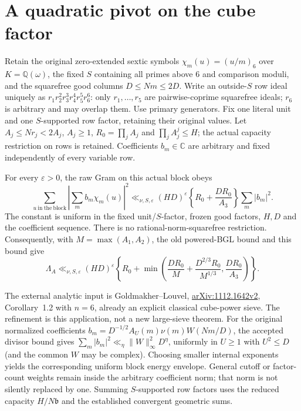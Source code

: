 \section{A quadratic pivot on the cube factor}\label{qp:core}
Retain the original zero-extended sextic symbols
$\chi_m(u)=(u/m)_6$ over $K=\mathbb Q(\omega)$, the fixed $S$ containing
all primes above $6$ and comparison moduli, and the squarefree good columns
$D\le Nm\le2D$. Write an outside-$S$ row ideal uniquely as
$r_1r_2^2r_3^3r_4^4r_5^5r_6^6$: only $r_1,\ldots,r_5$ are pairwise-coprime
squarefree ideals; $r_6$ is arbitrary and may overlap them. Use primary
generators. Fix one literal unit and one $S$-supported row factor, retaining
their original values. Let $A_j\le Nr_j<2A_j$, $A_j\ge1$,
$R_0=\prod_jA_j$ and $\prod_jA_j^j\le H$; the actual capacity restriction
on rows is retained. Coefficients $b_m\in\mathbb C$ are arbitrary and fixed
independently of every variable row.

\begin{proposition}\label{qp:bound}
For every $\varepsilon>0$, the raw Gram on this actual block obeys
\[
 \sum_{u\ \mathrm{in\ the\ block}}
       \left|\sum_m b_m\chi_m(u)\right|^2
 \ll_{\nu,S,\varepsilon}(HD)^\varepsilon
       \left\{R_0+\frac{DR_0}{A_3}\right\}\sum_m|b_m|^2.
\]
The constant is uniform in the fixed unit/$S$-factor, frozen good factors,
$H,D$ and the coefficient sequence. There is no rational-norm-squarefree
restriction. Consequently, with $M=\max(A_1,A_2)$, the old powered-BGL
bound and this bound give
\begin{equation}\label{qp:min}
 \Lambda_A\ll_{\nu,S,\varepsilon}(HD)^\varepsilon
 \left\{R_0+\min\left(
  \frac{DR_0}{M}+\frac{D^{2/3}R_0}{M^{1/3}},
  \frac{DR_0}{A_3}\right)\right\}.
\end{equation}
\end{proposition}
The external analytic input is Goldmakher--Louvel,
\href{https://arxiv.org/pdf/1112.1642v2}{arXiv:1112.1642v2},
Corollary~1.2 with $n=6$, already an explicit classical cube-power sieve.
The refinement is this application, not a new large-sieve theorem.
For the original normalized coefficients
$b_m=D^{-1/2}A_U(m)\nu(m)W(Nm/D)$, the accepted divisor bound gives
$\sum_m|b_m|^2\ll_\eta\|W\|_\infty^2D^\eta$, uniformly in
$U\ge1$ with $U^2\le D$ (and the common $W$ may be complex).
Choosing smaller internal exponents yields the corresponding uniform
block energy envelope. General cutoff or factor-count weights remain
inside the arbitrary coefficient norm; that norm is not silently replaced
by one. Summing $S$-supported row factors uses the reduced capacity
$H/N\mathfrak b$ and the established convergent geometric sums.

